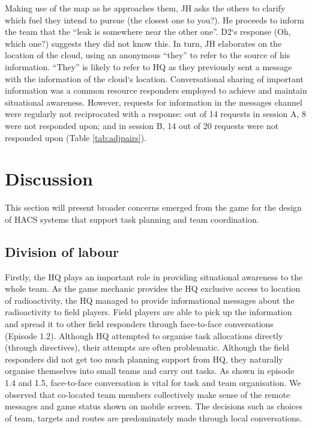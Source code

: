 Making use of the map as he approaches them, JH asks the others to clarify which fuel they intend to pursue (the closest one to you?). He proceeds to inform the team that the ``leak is somewhere near the other one''. D2`s response (Oh, which one?) suggests they did not know this. In turn, JH elaborates on the location of the cloud, using an anonymous ``they'' to refer to the source of his information. ``They'' is likely to refer to HQ as they previously sent a message with the information of the cloud`s location. Conversational sharing of important information was a common resource responders employed to achieve and maintain situational awareness. However, requests for information in the messages channel were regularly not reciprocated with a response: out of 14 requests in session A, 8 were not responded upon; and in session B, 14 out of 20 requests were not responded upon (Table \ref{tab:adjpairs}).\\

\section{Discussion}
This section will present broader concerns emerged from the game for the design of \ac{HACS} systems that support task planning and team coordination.\\

\subsection{Division of labour}\label{sec:study1dlabour}
Firstly, the HQ plays an important role in providing situational awareness to the whole team. As the game mechanic provides the HQ exclusive access to location of radioactivity, the HQ managed to provide informational messages about the radioactivity to field players. Field players are able to pick up the information and spread it to other field responders through face-to-face conversations (Episode 1.2). Although HQ attempted to organise task allocations directly (through directives), their attempts are often problematic.  Although the field responders did not get too much planning support from HQ, they naturally organise themselves into small teams and carry out tasks. As shown in episode 1.4 and 1.5,  face-to-face conversation is vital for task and team organisation. We observed that co-located team members collectively make sense of the remote messages and game status shown on mobile screen. The decisions such as choices of team, targets and routes are  predominately made through local conversations.\\

